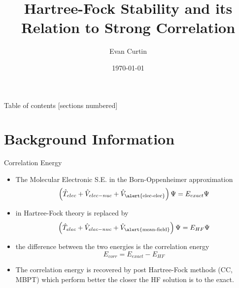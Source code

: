 \documentclass[10pt]{beamer}
\title{Hartree-Fock Stability and its Relation to Strong Correlation}
\date{\today}
\author{Evan Curtin}
\institute{University of Illinois at Urbana-Champaign}
\begin{document}
\maketitle

\begin{frame}{Table of contents}
  [sections numbered]
  \tableofcontents[hideallsubsections]
\end{frame}

\section{Background Information}

\begin{frame}{Correlation Energy}
	\begin{itemize}[<+->]
		\item {The Molecular Electronic S.E. in the Born-Oppenheimer approximation
		  \begin{equation*}
  		  \left( 
        \hat{T}_{elec} + \hat{V}_{elec-nuc} 
                       + \hat{V}_{\textrm{\alert{elec-elec}}} 
  		 \right)
  		 \Psi
  		  = E_{exact}\Psi
		  \end{equation*}
		}
		\item {in Hartree-Fock theory is replaced by
		  \begin{equation*}
  		  \left( 
        \hat{T}_{elec} + \hat{V}_{elec-nuc} + 
  		   \hat{V}_{\textrm{\alert{mean-field}}} 
  		 \right)
  		 \Psi
  		  = E_{HF}\Psi
		  \end{equation*}
		}
		\item {the difference between the two energies is the \alert{correlation energy}
		  \begin{equation*}
		    E_{corr} = E_{exact} - E_{HF}
		  \end{equation*}
    }
    \item {The correlation energy is recovered by post Hartree-Fock methods (CC, MBPT)
    which perform better the closer the HF solution is to the exact.
    }
	\end{itemize}
\end{frame}
\end{document}
